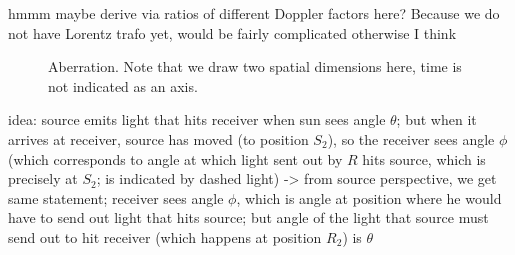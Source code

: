\documentclass[../relativity_main.tex]{subfiles}
\begin{document}
hmmm maybe derive via ratios of different Doppler factors here? Because we do not have Lorentz trafo yet, would be fairly complicated otherwise I think



\begin{figure}
	\centering

	\hspace*{0.1\textwidth}%


	\caption{Aberration. Note that we draw two spatial dimensions here, time is not indicated as an axis.}
	\label{fig:aberration}
\end{figure}



idea: source emits light that hits receiver when sun sees angle $\theta$; but when it arrives at receiver, source has moved (to position $S_2$), so the receiver sees angle $\phi$ (which corresponds to angle at which light sent out by $R$ hits source, which is precisely at $S_2$; is indicated by dashed light)
-> from source perspective, we get same statement; receiver sees angle $\phi$, which is angle at position where he would have to send out light that hits source; but angle of the light that source must send out to hit receiver (which happens at position $R_2$) is $\theta$



\end{document}
